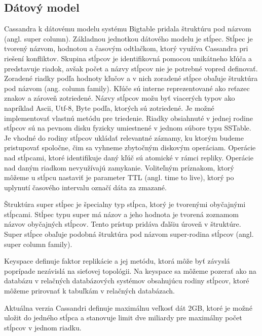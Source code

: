 \documentclass[11pt,twoside,a4paper]{book}
\begin{document}
\subsection{Dátový model}
Cassandra k dátovému modelu systému Bigtable pridala štruktúru pod názvom  (angl. super column). Základnou jednotkou dátového modelu je stĺpec. Stĺpec je tvorený názvom, hodnotou a časovým odtlačkom, ktorý využíva Cassandra pri riešení konfliktov. Skupina stĺpcov je identifikovná pomocou unikátneho kľúča a predstavuje riadok, avšak počet a názvy stĺpcov nie je potrebné vopred definovať. Zoradené riadky podľa hodnoty kľučov a v nich zoradené stĺpce obaľuje štruktúra pod názvom  (ang. column family). Kľúče sú interne reprezentované ako reťazec znakov a zároveň zotriedené. Názvy stĺpcov možu byť viacerých typov ako napríklad Ascii, Utf-8, Byte podľa, ktorých sú zotriedené. Je možné implementovať vlastnú metódu pre triedenie. Riadky obsiahnuté v jednej rodine stĺpcov sú na pevnom disku fyzicky umiestnené v jednom súbore typu SSTable. Je vhodné do rodiny stĺpcov ukládať relevantné záznamy, ku ktorým budeme pristupovať spoločne, čim sa vyhneme zbytočným diskovým operáciam. Operácie nad stĺpcami, ktoré identifikuje daný kľúč sú atomické v rámci repliky. Operácie nad daným riadkom nevyužívajú zamykanie. Voliteľným príznakom, ktorý môžeme u stĺpcu nastaviť je parameter TTL (angl. time to live), ktorý po uplynutí časového intervalu označí dáta za zmazané.

Štruktúra super stĺpec je špecialny typ stĺpca, ktorý je tvorenými obyčajnými stĺpcami. Stĺpec typu super má názov a jeho hodnota je tvorená zoznamom názvov obyčajných stĺpcov. Tento prístup pridáva ďalšiu úroveň v štruktúre. Super stĺpce obaľuje podobná štruktúra pod názvom super-rodina stĺpcov (angl. super column family). 

Keyspace definuje faktor replikácie a jej metódu, ktorá môže byť závyslá poprípade nezávislá na sieťovej topológii. Na keyspace sa môžeme pozerať ako na databázu v relačných databázových systémov obsahujúcu rodiny stĺpcov, ktoré môžeme prirovnať k tabuľkám v relačných databázach.

Aktuálna verzia Cassandri definuje maximálnu veľkosť dát 2GB, ktoré je možné uložit do jedného stĺpca a stanovuje limit dve miliardy pre maximálny počet stĺpcov v jednom riadku. 

\end{document}
